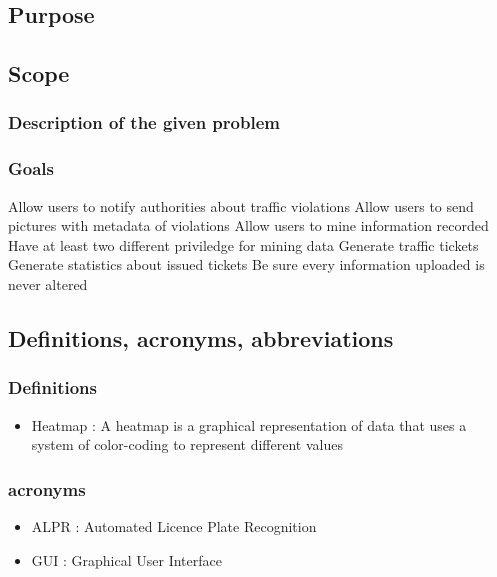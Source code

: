 \subsection{Purpose}


\subsection{Scope}

\subsubsection{Description of the given problem}


\subsubsection{Goals}
\begin{enumerate}
   Allow users to notify authorities about traffic violations
   Allow users to send pictures with metadata of violations
   Allow users to mine information recorded
   Have at least two different  priviledge for mining data
   Generate traffic tickets
   Generate statistics about issued tickets
   Be sure every information uploaded is never altered
\end{enumerate}



\subsection{Definitions,  acronyms,  abbreviations}

\subsubsection{Definitions}
\begin{itemize}
  \item Heatmap : A heatmap is a graphical representation of data that uses a system of color-coding to represent different values

\end{itemize}




\subsubsection{acronyms}
\begin{itemize}
  \item ALPR : Automated Licence Plate Recognition
  \item GUI : Graphical User Interface
\end{itemize}

